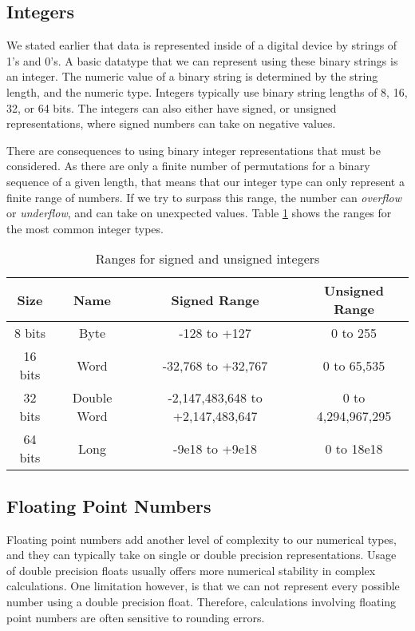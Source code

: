 \subsection{Integers} 

We stated earlier that data is represented inside of a digital device by strings of 1's and 0's.   A basic datatype that we can represent using these binary strings is an integer.  The numeric value of a binary string is determined by the string length, and the numeric type.  Integers typically use binary string lengths of 8, 16, 32, or 64 bits.  The integers can also either have signed, or unsigned representations, where signed numbers can take on negative values.

There are consequences to using binary integer representations that must be considered.  As there are only a finite number of permutations for a binary sequence of a given length, that means that our integer type can only represent a finite range of numbers.   If we try to surpass this range, the number can \emph{overflow} or \emph{underflow}, and can take on unexpected values.  Table \ref{tab:bit_sizes} shows the ranges for the most common integer types.

\begin{table}[ht]
  \centering
  \begin{tabular}{ | c | c | c | c | }
    \hline
    Size & Name & Signed Range & Unsigned Range \\
    \hline
    8 bits & Byte & -128 to +127 & 0 to 255 \\
    16 bits & Word & -32,768 to +32,767 & 0 to 65,535 \\
    32 bits & Double Word & -2,147,483,648 to +2,147,483,647  & 0 to 4,294,967,295 \\
    64 bits & Long & -9e18 to +9e18 & 0 to 18e18 \\
    \hline
  \end{tabular}
  \caption{Ranges for signed and unsigned integers}
  \label{tab:bit_sizes}
\end{table}

\subsection{Floating Point Numbers} 

Floating point numbers add another level of complexity to our numerical types, and they can typically take on single or double precision representations.  Usage of double precision floats usually offers more numerical stability in complex calculations.  One limitation however, is that we can not represent every possible number using a double precision float.  Therefore, calculations involving floating point numbers are often sensitive to rounding errors.

